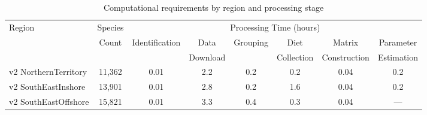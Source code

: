 \begin{table}[htbp]
\centering
\footnotesize
\caption{Computational requirements by region and processing stage}
\label{tab:timing_analysis}
\begin{tabular}{lccccccc}
\hline
Region & Species & \multicolumn{6}{c}{Processing Time (hours)} \\
\cline{3-8}
 & Count & Identification & Data & Grouping & Diet & Matrix & Parameter \\
 & & & Download & & Collection & Construction & Estimation \\
\hline
v2 NorthernTerritory & 11,362 & 0.01 & 2.2 & 0.2 & 0.2 & 0.04 & 0.2 \\
v2 SouthEastInshore & 13,901 & 0.01 & 2.8 & 0.2 & 1.6 & 0.04 & 0.2 \\
v2 SouthEastOffshore & 15,821 & 0.01 & 3.3 & 0.4 & 0.3 & 0.04 & --- \\
\hline
\end{tabular}
\vspace{1ex}
\end{table}
